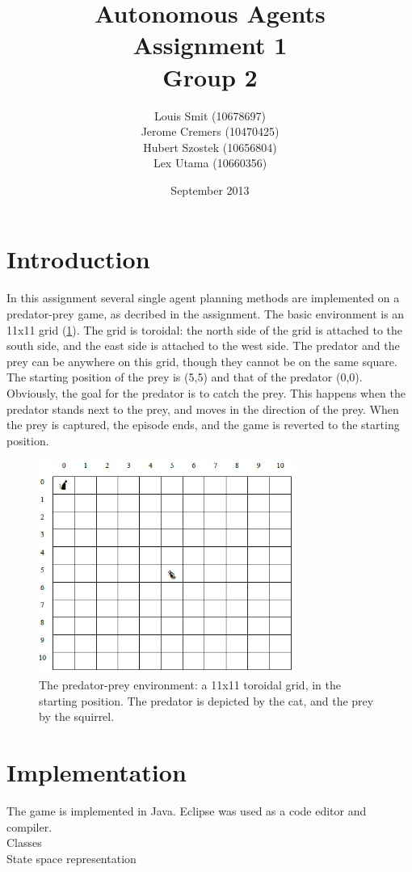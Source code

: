 \documentclass{article}
\title{Autonomous Agents \\ Assignment 1 \\ Group 2}
\author{Louis Smit (10678697) \\ Jerome Cremers (10470425) \\
Hubert Szostek (10656804) \\ Lex Utama (10660356)}
\date{September 2013}
\begin{document}
\maketitle 

\section{Introduction}
In this assignment several single agent planning methods are implemented on a predator-prey game, as decribed in the assignment. The basic environment is an 11x11 grid (\ref{Grid}). The grid is
toroidal: the north side of the grid is attached to the south side, and the east side is attached to the west side. The predator and the prey can be anywhere on this grid, though they cannot be on the same square. The starting position of the prey is (5,5) and that of the predator (0,0).\\
Obviously, the goal for the predator is to catch the prey. This happens when the predator stands next to the prey, and moves in the direction of the prey. When the prey is captured, the episode ends, and the game is reverted to the starting position.

\begin{figure}[hb] 
  \centering
  \includegraphics[width=3.3in]{Grid_world}
  \caption[Figure 1]
   {The predator-prey environment: a 11x11 toroidal grid, in the starting position. The predator is depicted by the cat, and the prey by the squirrel.}
   \label{Grid}
\end{figure}


\section{Implementation}
The game is implemented in Java. Eclipse was used as a code editor and compiler. \\
Classes\\
State space representation\\
\end{document}

